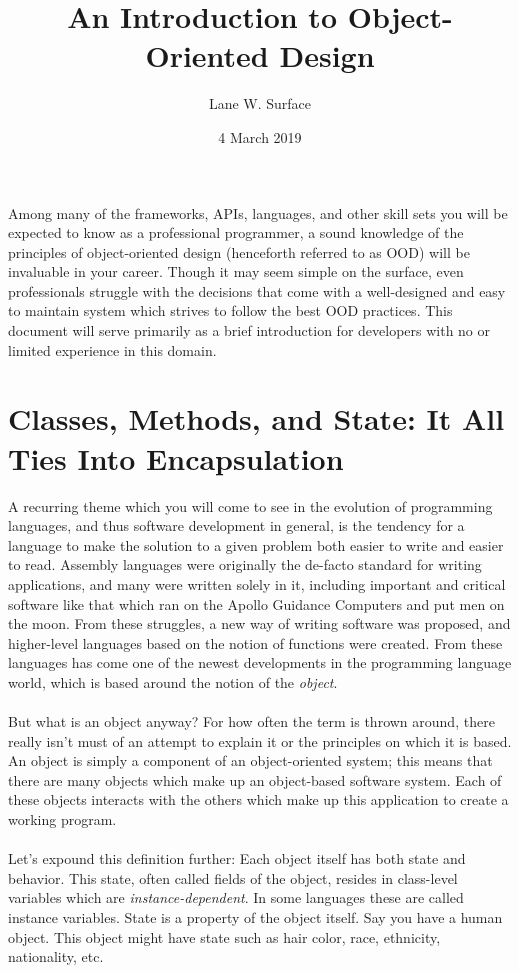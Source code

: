 \documentclass{article}
\title{An Introduction to Object-Oriented Design}
\author{Lane W. Surface}
\date{4 March 2019}
\begin{document}
\maketitle

\newpage
{}

\noindent
\textsf{
Among many of the frameworks, APIs, languages, and other skill sets you will be
expected to know as a professional programmer, a sound knowledge of the
principles of object-oriented design (henceforth referred to as OOD) will be
invaluable in your career. Though it may seem simple on the surface, even
professionals struggle with the decisions that come with a well-designed and
easy to maintain system which strives to follow the best OOD practices. This
document will serve primarily as a brief introduction for developers with no or
limited experience in this domain.
}

\section{Classes, Methods, and State: It All Ties Into Encapsulation}
A recurring theme which you will come to see in the evolution of programming
languages, and thus software development in general, is the tendency for a
language to make the solution to a given problem both easier to write and easier to read.
Assembly languages were originally the de-facto standard for writing
applications, and many were written solely in it, including important and
critical software like that which ran on the Apollo Guidance Computers and put
men on the moon. From these struggles, a new way of writing software was
proposed, and higher-level languages based on the notion of functions were
created. From these languages has come one of the newest developments in the
programming language world, which is based around the notion of the
\textit{object}.
\paragraph{}
But what is an object anyway? For how often the term is thrown around, there
really isn't must of an attempt to explain it or the principles on which it is
based. An object is simply a component of an object-oriented system; this means
that there are many objects which make up an object-based software system. Each
of these objects interacts with the others which make up this application to
create a working program.
\paragraph{}
Let’s expound this definition further: Each object itself has both state and
behavior. This state, often called fields of the object, resides in class-level
variables which are \textit{instance-dependent}. In some languages these are
called
instance variables. State is a property of the object itself. Say you have a
human object. This object might have state such as hair color, race, ethnicity,
nationality, etc.
\end{document}
